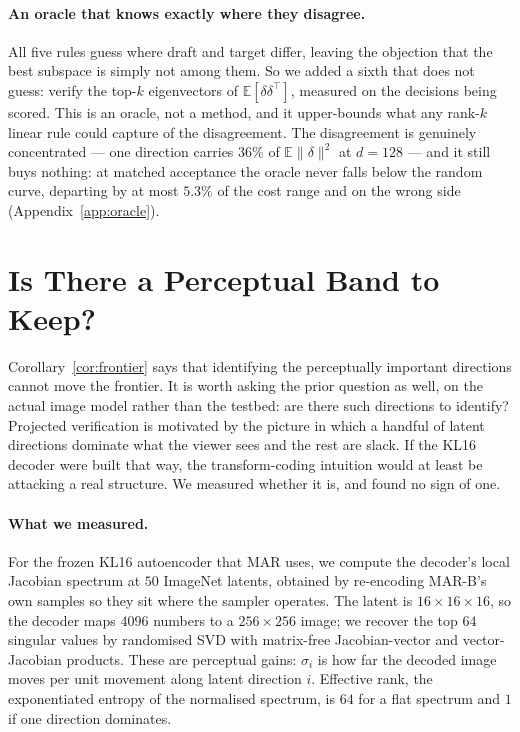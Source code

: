 \documentclass[10pt]{article}
\newcommand{\E}{\mathbb{E}}
\newcommand{\dd}{d}
\newcommand{\kk}{k}
\begin{document}
\paragraph{An oracle that knows exactly where they disagree.} All five rules guess where draft and
target differ, leaving the objection that the best subspace is simply not among them. So we added a
sixth that does not guess: verify the top-$\kk$ eigenvectors of $\E[\delta\delta^\top]$, measured on
the decisions being scored. This is an oracle, not a method, and it upper-bounds what any rank-$\kk$
linear rule could capture of the disagreement. The disagreement is genuinely concentrated --- one
direction carries $36\%$ of $\E\|\delta\|^2$ at $\dd{=}128$ --- and it still buys nothing: at matched
acceptance the oracle never falls below the random curve, departing by at most $5.3\%$ of the cost
range and on the wrong side (Appendix~\ref{app:oracle}).

\section{Is There a Perceptual Band to Keep?}
\label{sec:kl16}

Corollary~\ref{cor:frontier} says that identifying the perceptually important directions cannot move
the frontier. It is worth asking the prior question as well, on the actual image model rather than
the testbed: are there such directions to identify? Projected verification is motivated by the
picture in which a handful of latent directions dominate what the viewer sees and the rest are slack.
If the KL16 decoder were built that way, the transform-coding intuition would at least be attacking a
real structure. We measured whether it is, and found no sign of one.

\paragraph{What we measured.} For the frozen KL16 autoencoder that MAR uses, we compute the decoder's
local Jacobian spectrum at $50$ ImageNet latents, obtained by re-encoding MAR-B's own samples so they
sit where the sampler operates. The latent is $16 \times 16 \times 16$, so the decoder maps $4096$
numbers to a $256 \times 256$ image; we recover the top $64$ singular values by randomised SVD with
matrix-free Jacobian-vector and vector-Jacobian products. These are perceptual gains: $\sigma_i$ is
how far the decoded image moves per unit movement along latent direction $i$. Effective rank, the
exponentiated entropy of the normalised spectrum, is $64$ for a flat spectrum and $1$ if one direction
dominates.
\end{document}
